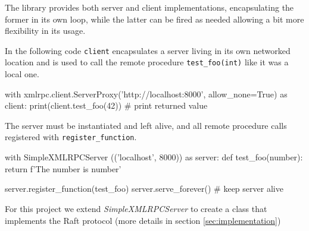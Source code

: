 The library provides both server and client implementations, encapsulating the former in its own loop, while the latter can be fired as needed allowing a bit more flexibility in its usage.

In the following code \verb|client| encapsulates a server living in its own networked location and is used to call the remote procedure \verb|test_foo(int)| like it was a local one.

\begin{python}
with xmlrpc.client.ServerProxy('http://localhost:8000', allow_none=True) as client:
    print(client.test_foo(42)) # print returned value
\end{python}

The server must be instantiated and left alive, and all remote procedure calls registered with \verb|register_function|.

\begin{python}
with SimpleXMLRPCServer (('localhost', 8000)) as server:
    def test_foo(number):
        return f'The number is {number}'

    server.register_function(test_foo)  
    server.serve_forever() # keep server alive
\end{python}

For this project we extend \textit{SimpleXMLRPCServer} to create a class that implements the Raft protocol (more details in section \ref{sec:implementation})